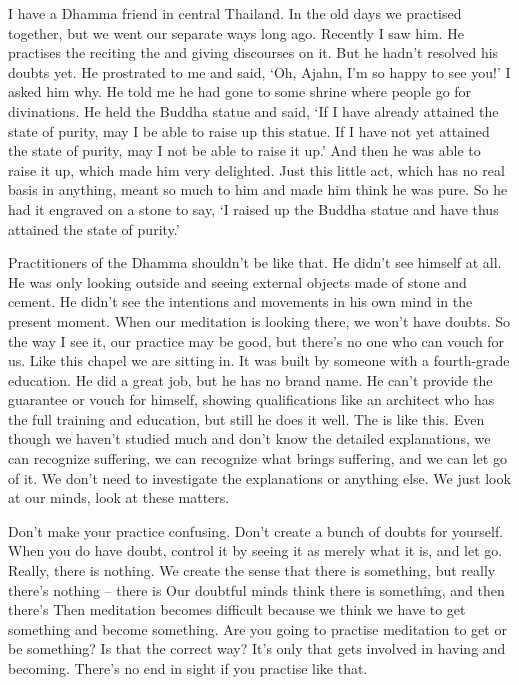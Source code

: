 I have a Dhamma friend in central Thailand. In the old days we practised together, but we went our separate ways long ago. Recently I saw him. He practises the  reciting the  and giving discourses on it. But he hadn't resolved his doubts yet. He prostrated to me and said, `Oh, Ajahn, I'm so happy to see you!' I asked him why. He told me he had gone to some shrine where people go for divinations. He held the Buddha statue and said, `If I have already attained the state of purity, may I be able to raise up this statue. If I have not yet attained the state of purity, may I not be able to raise it up.' And then he was able to raise it up, which made him very delighted. Just this little act, which has no real basis in anything, meant so much to him and made him think he was pure. So he had it engraved on a stone to say, `I raised up the Buddha statue and have thus attained the state of purity.'

Practitioners of the Dhamma shouldn't be like that. He didn't see himself at all. He was only looking outside and seeing external objects made of stone and cement. He didn't see the intentions and movements in his own mind in the present moment. When our meditation is looking there, we won't have doubts. So the way I see it, our practice may be good, but there's no one who can vouch for us. Like this chapel we are sitting in. It was built by someone with a fourth-grade education. He did a great job, but he has no brand name. He can't provide the guarantee or vouch for himself, showing qualifications like an architect who has the full training and education, but still he does it well. The  is like this. Even though we haven't studied much and don't know the detailed explanations, we can recognize suffering, we can recognize what brings suffering, and we can let go of it. We don't need to investigate the explanations or anything else. We just look at our minds, look at these matters.

Don't make your practice confusing. Don't create a bunch of doubts for yourself. When you do have doubt, control it by seeing it as merely what it is, and let go. Really, there is nothing. We create the sense that there is something, but really there's nothing -- there is  Our doubtful minds think there is something, and then there's  Then meditation becomes difficult because we think we have to get something and become something. Are you going to practise meditation to get or be something? Is that the correct way? It's only  that gets involved in having and becoming. There's no end in sight if you practise like that.

